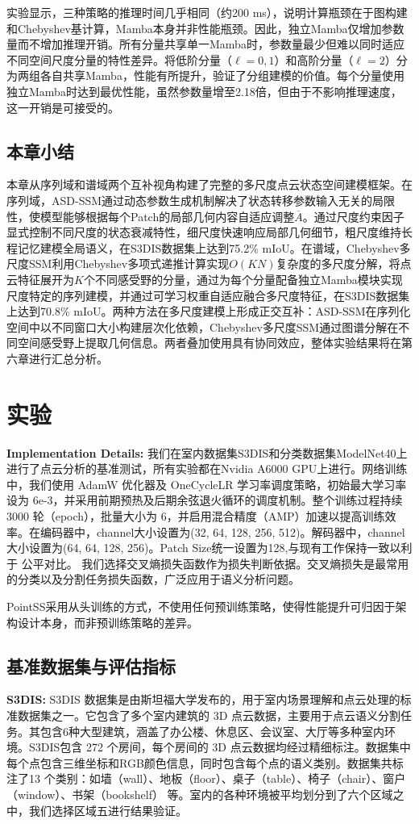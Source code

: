\documentclass[12pt,a4paper,openany,oneside]{ctexbook}
\theoremstyle{definition}
\theoremstyle{remark}
\begin{document}
实验显示，三种策略的推理时间几乎相同（约200 ms），说明计算瓶颈在于图构建和Chebyshev基计算，Mamba本身并非性能瓶颈。因此，独立Mamba仅增加参数量而不增加推理开销。所有分量共享单一Mamba时，参数量最少但难以同时适应不同空间尺度分量的特性差异。将低阶分量（$\ell=0,1$）和高阶分量（$\ell=2$）分为两组各自共享Mamba，性能有所提升，验证了分组建模的价值。每个分量使用独立Mamba时达到最优性能，虽然参数量增至2.18倍，但由于不影响推理速度，这一开销是可接受的。

\section{本章小结}

本章从序列域和谱域两个互补视角构建了完整的多尺度点云状态空间建模框架。在序列域，ASD-SSM通过动态参数生成机制解决了状态转移参数输入无关的局限性，使模型能够根据每个Patch的局部几何内容自适应调整$\overline{A}$。通过尺度约束因子显式控制不同尺度的状态衰减特性，细尺度快速响应局部几何细节，粗尺度维持长程记忆建模全局语义，在S3DIS数据集上达到75.2\% mIoU。在谱域，Chebyshev多尺度SSM利用Chebyshev多项式递推计算实现$O(KN)$复杂度的多尺度分解，将点云特征展开为$K$个不同感受野的分量，通过为每个分量配备独立Mamba模块实现尺度特定的序列建模，并通过可学习权重自适应融合多尺度特征，在S3DIS数据集上达到70.8\% mIoU。两种方法在多尺度建模上形成正交互补：ASD-SSM在序列化空间中以不同窗口大小构建层次化依赖，Chebyshev多尺度SSM通过图谱分解在不同空间感受野上提取几何信息。两者叠加使用具有协同效应，整体实验结果将在第六章进行汇总分析。

\chapter{实验}
\textbf{Implementation Details:}
我们在室内数据集S3DIS和分类数据集ModelNet40上进行了点云分析的基准测试，所有实验都在Nvidia A6000 GPU上进行。网络训练中，我们使用 AdamW 优化器及 OneCycleLR 学习率调度策略，初始最大学习率设为 6e-3，并采用前期预热及后期余弦退火循环的调度机制。整个训练过程持续 3000 轮（epoch），批量大小为 6，并启用混合精度（AMP）加速以提高训练效率。在编码器中，channel大小设置为(32, 64, 128, 256, 512)。解码器中，channel大小设置为(64, 64, 128, 256)。Patch Size统一设置为128,与现有工作保持一致以利于
公平对比。
我们选择交叉熵损失函数作为损失判断依据。交叉熵损失是最常用的分类以及分割任务损失函数，广泛应用于语义分析问题。

PointSS采用从头训练的方式，不使用任何预训练策略，使得性能提升可归因于架构设计本身，而非预训练策略的差异。


\section{基准数据集与评估指标}
\textbf{S3DIS:}
S3DIS 数据集是由斯坦福大学发布的，用于室内场景理解和点云处理的标准数据集之一。它包含了多个室内建筑的 3D 点云数据，主要用于点云语义分割任务。其包含6种大型建筑，涵盖了办公楼、休息区、会议室、大厅等多种室内环境。S3DIS包含 272 个房间，每个房间的 3D 点云数据均经过精细标注。数据集中每个点包含三维坐标和RGB颜色信息，同时包含每个点的语义类别。数据集共标注了13 个类别：如墙（wall）、地板（floor）、桌子（table）、椅子（chair）、窗户（window）、书架（bookshelf） 等。室内的各种环境被平均划分到了六个区域之中，我们选择区域五进行结果验证。
\end{document}
